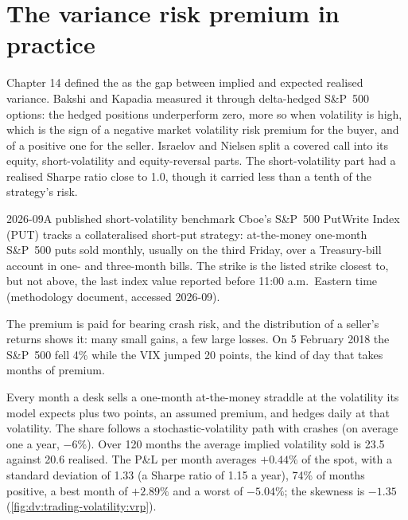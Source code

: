\section{The variance risk premium in practice}

Chapter 14 defined the  as the gap between implied and expected realised variance. Bakshi and Kapadia measured it through
delta-hedged S\&P~500 options: the hedged positions underperform zero, more so when volatility is high, which is the sign of a negative market
volatility risk premium for the buyer, and of a positive one for the seller. Israelov and Nielsen split a covered call into its equity, short-volatility
and equity-reversal parts. The short-volatility part had a realised Sharpe ratio close to 1.0, though it carried less than a tenth of the strategy's
risk.

\begin{dated}{2026-09}{A published short-volatility benchmark}\label{dat:dv:trading-volatility:put}
Cboe's S\&P~500 PutWrite Index (PUT) tracks a collateralised short-put strategy: at-the-money one-month S\&P~500 puts sold monthly, usually on the
third Friday, over a Treasury-bill account in one- and three-month bills. The strike is the listed strike closest to, but not above, the last
index value reported before 11:00 a.m.\ Eastern time (methodology document, accessed 2026-09).
\end{dated}

The premium is paid for bearing crash risk, and the distribution of a seller's returns shows it: many small gains, a few large losses. On 5 February
2018 the S\&P~500 fell 4\% while the VIX jumped 20 points, the kind of day that takes months of premium.

\begin{example}\label{ex:dv:trading-volatility:vrp}
Every month a desk sells a one-month at-the-money straddle at the volatility its model expects plus two points, an assumed premium, and hedges
daily at that volatility. The share follows a stochastic-volatility path with crashes (on average one a year, $-6\%$). Over 120 months the average
implied volatility sold is 23.5 against 20.6 realised. The P\&L per month averages $+0.44\%$ of the spot, with a standard deviation of 1.33 (a
Sharpe ratio of 1.15 a year), 74\% of months positive, a best month of $+2.89\%$ and a worst of $-5.04\%$; the skewness is $-1.35$
(\cref{fig:dv:trading-volatility:vrp}).
\end{example}

